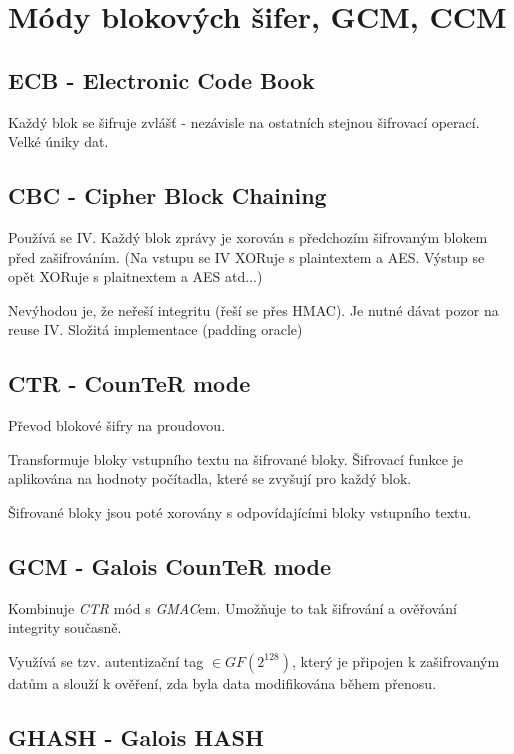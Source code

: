 \documentclass[10pt,a4paper]{article}
\begin{document}
\section{Módy blokových šifer, GCM, CCM}

\subsection{ECB - Electronic Code Book}
Každý blok se šifruje zvlášť - nezávisle na ostatních stejnou šifrovací operací.
Velké úniky dat.

\subsection{CBC - Cipher Block Chaining}
Používá se IV.
Každý blok zprávy je xorován s předchozím šifrovaným blokem před zašifrováním.
(Na vstupu se IV XORuje s plaintextem a AES. Výstup se opět XORuje s plaitnextem a AES atd...)

Nevýhodou je, že neřeší integritu (řeší se přes HMAC).
Je nutné dávat pozor na reuse IV. Složitá implementace (padding oracle)

\subsection{CTR - CounTeR mode}

Převod blokové šifry na proudovou.

Transformuje bloky vstupního textu na šifrované bloky.
Šifrovací funkce je aplikována na hodnoty počítadla, které se zvyšují pro každý blok.

Šifrované bloky jsou poté xorovány s odpovídajícími bloky vstupního textu.

\subsection{GCM - Galois CounTeR mode}

Kombinuje \textit{CTR} mód s \textit{GMAC}em.
Umožňuje to tak šifrování a ověřování integrity současně.

Využívá se tzv. autentizační tag $\in GF(2^{128})$, který je připojen k zašifrovaným datům a slouží k ověření, zda byla data modifikována během přenosu.

\subsection{GHASH - Galois HASH}
\end{document}
